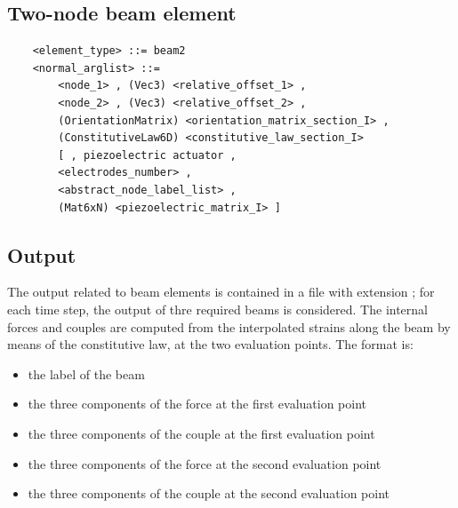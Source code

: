 \subsection{Two-node beam element}
\begin{verbatim}
    <element_type> ::= beam2
    <normal_arglist> ::=
        <node_1> , (Vec3) <relative_offset_1> ,
        <node_2> , (Vec3) <relative_offset_2> ,
        (OrientationMatrix) <orientation_matrix_section_I> ,
        (ConstitutiveLaw6D) <constitutive_law_section_I>
        [ , piezoelectric actuator , 
        <electrodes_number> ,
        <abstract_node_label_list> ,
        (Mat6xN) <piezoelectric_matrix_I> ]
\end{verbatim}

\subsection{Output}
The output related to beam elements is contained in a file with extension 
; for each time step, the output of thre required beams is
considered.
The internal forces and couples are computed from the interpolated strains
along the beam by means of the constitutive law, at the two evaluation
points. 
The format is:
\begin{itemize}
    \item the label of the beam
    \item the three components of the force at the first evaluation point
    \item the three components of the couple at the first evaluation point
    \item the three components of the force at the second evaluation point
    \item the three components of the couple at the second evaluation point    
\end{itemize}



